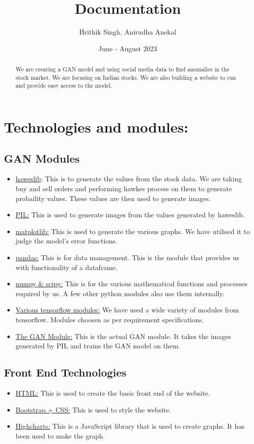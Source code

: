 \documentclass{article}
\begin{document}
\title{Documentation}
\author{Hrithik Singh, Anirudha Anekal}
\date{June - August 2023}
\maketitle
\begin{abstract}
We are creating a GAN model and using social media data to find anomalies in the stock market. We are focusing on Indian stocks. We are also building a website to run and provide easy access to the model.
\end{abstract}
\section{Technologies and modules:}
\subsection{GAN Modules}
\begin{itemize}
\item \underline{haweslib}: This is to generate the values from the stock data. We are taking buy and sell orders and performing hawkes process on them to generate probaility values. These values are then used to generate images.
\item \underline{PIL:} This is used to generate images from the values generated by haweslib.
\item \underline{matplotlib:} This is used to generate the various graphs. We have utilised it to judge the model's error functions.
\item \underline{pandas:} This is for data management. This is the module that provides us with functionality of a dataframe.
\item \underline{numpy \& scipy:} This is for the various mathematical functions and processes required by us. A few other python modules also use them internally.
\item \underline{Various tensorflow modules:} We have used a wide variety of modules from tensorflow. Modules choosen as per requirement specifications.
\item \underline{The GAN Module:} This is the actual GAN module. It takes the images generated by PIL and trains the GAN model on them.
\end{itemize}
\subsection{Front End Technologies}
\begin{itemize}
\item \underline{HTML:} This is used to create the basic front end of the website.
\item \underline{Bootstrap + CSS:} This is used to style the website.
\item \underline{Highcharts:} This is a JavaScript library that is used to create graphs. It has been used to make the graph.
\end{itemize}
\end{document}
